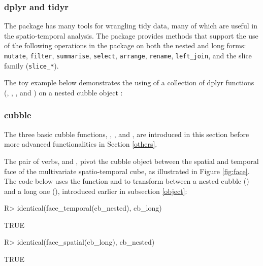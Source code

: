 \documentclass[
  shortnames]{jss}
\begin{document}
\hypertarget{dplyr-and-tidyr}{%
\subsubsection{dplyr and tidyr}\label{dplyr-and-tidyr}}

The  package has many tools for wrangling tidy data, many of which are useful in the spatio-temporal analysis. The  package provides methods that support the use of the following operations in the  package on both the nested and long forms: \texttt{mutate}, \texttt{filter}, \texttt{summarise}, \texttt{select}, \texttt{arrange}, \texttt{rename}, \texttt{left\_join}, and the slice family (\texttt{slice\_*}).

The toy example below demonstrates the using of a collection of dplyr functions (, , , and ) on a nested cubble object :

\begin{CodeChunk}
\end{CodeChunk}

\hypertarget{cubble-1}{%
\subsubsection{cubble}\label{cubble-1}}

The three basic cubble functions, , , and , are introduced in this section before more advanced functionalities in Section \ref{others}.

The pair of verbs,  and , pivot the cubble object between the spatial and temporal face of the multivariate spatio-temporal cube, as illustrated in Figure \ref{fig:face}. The code below uses the function  and  to transform between a nested cubble () and a long one (), introduced earlier in subsection \ref{object}:

\begin{CodeChunk}
\begin{CodeInput}
R> identical(face_temporal(cb_nested), cb_long)
\end{CodeInput}
\begin{CodeOutput}
[1] TRUE
\end{CodeOutput}
\begin{CodeInput}
R> identical(face_spatial(cb_long), cb_nested)
\end{CodeInput}
\begin{CodeOutput}
[1] TRUE
\end{CodeOutput}
\end{CodeChunk}
\end{document}
